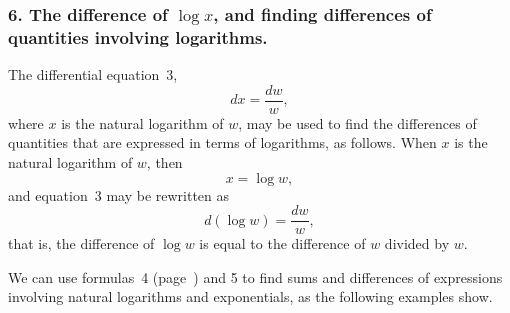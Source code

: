 \documentclass[polutonikogreek,english,twoside,openright]{article}
\begin{document}
\subsubsection*{6. The difference of $\log x$, and finding differences of quantities involving logarithms.}

The differential equation~3,
$$dx = \frac{dw}{w},\label{deq}$$
where $x$ is the natural logarithm of $w$, may be used to find the
differences of quantities that are expressed in terms of logarithms,
as follows.  When $x$ is the natural logarithm of $w$, then
$$x = \log w,$$
and equation~3 may be rewritten as
\begin{equation}
d(\log w) = \frac{dw}{w} \label{dlog},
\end{equation}
that is, the difference of $\log w$ is equal to the difference of $w$ divided by $w$.

We can use formulas~4 (page~\pageref{dex}) and 5 to find sums and
differences of expressions involving natural logarithms and
exponentials, as the following examples show.
\end{document}
